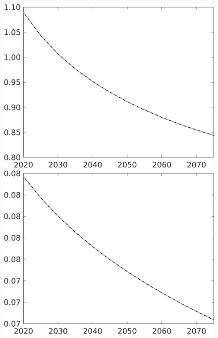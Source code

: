 \documentclass[12pt]{article}
\begin{document}
\begin{figure}[h!!]
\begin{minipage}[]{0.32\textwidth}
	\end{minipage}	
	\begin{minipage}[]{0.32\textwidth}
		\includegraphics[width=1\textwidth]{../../codding_model/own_basedOnFried/optimalPol_010922_revision/figures/all_13Sept22/CompTaul_LFBAU_Reg0_pg_spillover0_nsk1_xgr1_knspil0_sep1_countec0_GovRev0_etaa0.79_lgd0.png}
	\end{minipage}		
	\begin{minipage}[]{0.32\textwidth}
		\includegraphics[width=1\textwidth]{../../codding_model/own_basedOnFried/optimalPol_010922_revision/figures/all_13Sept22/CompTaul_LFBAU_Reg0_pepn_spillover0_nsk1_xgr1_knspil0_sep1_countec0_GovRev0_etaa0.79_lgd0.png}

\end{minipage}
\end{figure}
\end{document}
